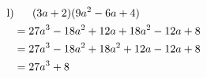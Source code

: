 \begin{exercise}
{\begin{equation*}
      \end{equation*}
    }%
    \newcommand{\solutionL}[1]
    {%
      \begin{equation*}
        \begin{split}
          \text{l)} &\toprow[#1]{(3a+2)(9a^2-6a+4)}          \\
                    &=           27a^3-18a^2+12a+18a^2-12a+8 \\
                    &=           27a^3-18a^2+18a^2+12a-12a+8 \\
                    &=           27a^3+8
        \end{split}
      \end{equation*}
    }%

    \begin{minipage}[t]{0.49\textwidth}
      \small
      \solutionA{20em}
    \end{minipage}%
    \hfill
    \begin{minipage}[t]{0.49\textwidth}
      \small
      \solutionB{20em}
    \end{minipage}%

    \begin{minipage}[t]{0.49\textwidth}
      \small
      \solutionC{20em}
    \end{minipage}%
    \hfill
    \begin{minipage}[t]{0.49\textwidth}
      \small
      \solutionD{20em}
    \end{minipage}%

    \begin{minipage}[t]{0.49\textwidth}
      \small
      \solutionE{20em}
    \end{minipage}%
    \hfill
    \begin{minipage}[t]{0.49\textwidth}
      \small
      \solutionF{20em}
    \end{minipage}%

    \begin{minipage}[t]{0.49\textwidth}
      \small
      \solutionG{20em}
    \end{minipage}%
    \hfill
    \begin{minipage}[t]{0.49\textwidth}
      \small
      \solutionH{20em}
    \end{minipage}%

    \begin{minipage}[t]{0.49\textwidth}
      \small
      \solutionI{20em}
    \end{minipage}%
    \hfill
    \begin{minipage}[t]{0.49\textwidth}
      \small
      \solutionJ{20em}
    \end{minipage}%

    \begin{minipage}[t]{0.49\textwidth}
      \small
      \solutionK{20em}
    \end{minipage}%
    \hfill
    \begin{minipage}[t]{0.49\textwidth}
      \small
      \solutionL{20em}
    \end{minipage}%

  \fi
\end{exercise}

